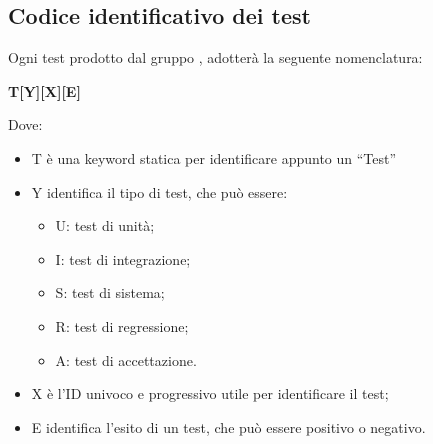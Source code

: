 \subsection{Codice identificativo dei test}
Ogni test prodotto dal gruppo {\Gruppo}, adotterà la seguente nomenclatura:
\begin{center} \textbf{T[Y][X][E]} \end{center}
Dove:
\begin{itemize}
	\item T è una keyword statica per identificare appunto un “Test”
	\item Y identifica il tipo di test, che può essere:
		\begin{itemize}
			\item U: test di unità;
			\item I: test di integrazione;
			\item S: test di sistema;
			\item R: test di regressione;
			\item A: test di accettazione.
		\end{itemize}
		\item X è l'ID univoco e progressivo utile per identificare il test;
		\item E identifica l'esito di un test, che può essere positivo o negativo.
\end{itemize}
